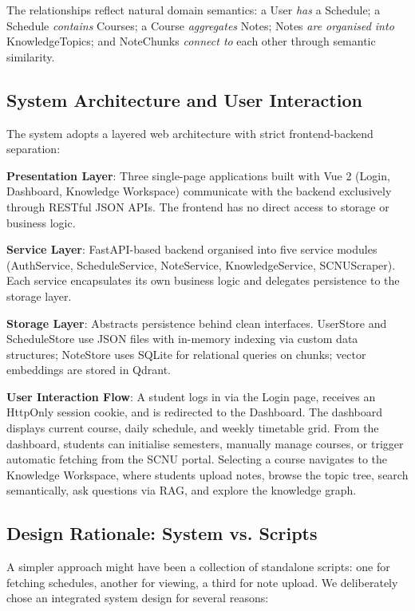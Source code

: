 \documentclass[11pt,a4paper]{article}
\begin{document}
The relationships reflect natural domain semantics: a User \textit{has} a Schedule; a Schedule \textit{contains} Courses; a Course \textit{aggregates} Notes; Notes \textit{are organised into} KnowledgeTopics; and NoteChunks \textit{connect to} each other through semantic similarity.

\subsection{System Architecture and User Interaction}
The system adopts a layered web architecture with strict frontend-backend separation:

\textbf{Presentation Layer}: Three single-page applications built with Vue 2 (Login, Dashboard, Knowledge Workspace) communicate with the backend exclusively through RESTful JSON APIs. The frontend has no direct access to storage or business logic.

\textbf{Service Layer}: FastAPI-based backend organised into five service modules (AuthService, ScheduleService, NoteService, KnowledgeService, SCNUScraper). Each service encapsulates its own business logic and delegates persistence to the storage layer.

\textbf{Storage Layer}: Abstracts persistence behind clean interfaces. UserStore and ScheduleStore use JSON files with in-memory indexing via custom data structures; NoteStore uses SQLite for relational queries on chunks; vector embeddings are stored in Qdrant.

\textbf{User Interaction Flow}: A student logs in via the Login page, receives an HttpOnly session cookie, and is redirected to the Dashboard. The dashboard displays current course, daily schedule, and weekly timetable grid. From the dashboard, students can initialise semesters, manually manage courses, or trigger automatic fetching from the SCNU portal. Selecting a course navigates to the Knowledge Workspace, where students upload notes, browse the topic tree, search semantically, ask questions via RAG, and explore the knowledge graph.

\subsection{Design Rationale: System vs. Scripts}
A simpler approach might have been a collection of standalone scripts: one for fetching schedules, another for viewing, a third for note upload. We deliberately chose an integrated system design for several reasons:
\end{document}
